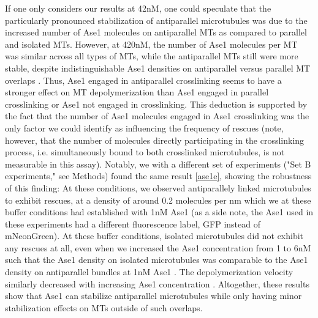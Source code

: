 If one only considers our results at 42nM, one could speculate that the particularly pronounced stabilization of antiparallel microtubules was due to the increased number of Ase1 molecules on antiparallel MTs as compared to parallel and isolated MTs. However, at 420nM, the number of Ase1 molecules per MT was similar across all types of MTs, while the antiparallel MTs still were more stable, despite indistinguishable Ase1 densities on antiparallel versus parallel MT overlaps . Thus, Ase1 engaged in antiparallel crosslinking seems to have a stronger effect on MT depolymerization than Ase1 engaged in parallel crosslinking or Ase1 not engaged in crosslinking. This deduction is supported by the fact that the number of Ase1 molecules engaged in Ase1 crosslinking was the only factor we could identify as influencing the frequency of rescues (note, however, that the number of molecules directly participating in the crosslinking process, i.e. simultaneously bound to both crosslinked microtubules, is not measurable in this assay). Notably, we with a different set of experiments ("Set B experiments," see Methods) found the same result \autoref{ase1e}, showing the robustness of this finding: At these conditions, we observed antiparallely linked microtubules to exhibit rescues, at a density of around 0.2 molecules per nm which we at these buffer conditions had established with 1nM Ase1  (as a side note, the Ase1 used in these experiments had a different fluorescence label, GFP instead of mNeonGreen). At these buffer conditions, isolated microtubules did not exhibit any rescues at all, even when we increased the Ase1 concentration from 1 to 6nM such that the Ase1 density on isolated microtubules was comparable to the Ase1 density on antiparallel bundles at 1nM Ase1 . The depolymerization velocity similarly decreased with increasing Ase1 concentration . Altogether, these results show that Ase1 can stabilize antiparallel microtubules while only having minor stabilization effects on MTs outside of such overlaps.

